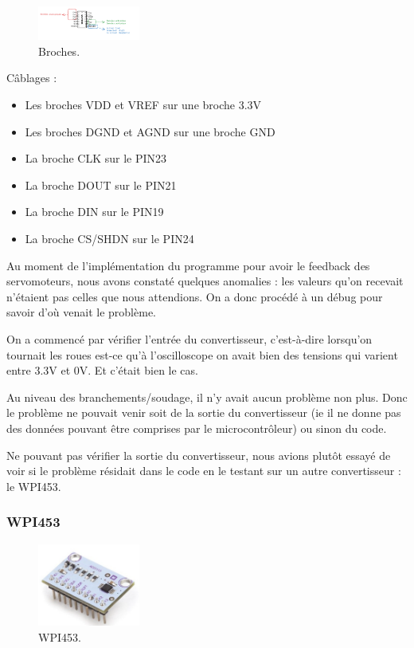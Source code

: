 \documentclass[a4paper,12pt]{report}  %
\begin{document}
\begin{figure}[H]
	\centering
	\includegraphics[width=0.3\textwidth]{./attachments/broches.png}
	\caption{Broches.}
\end{figure}

Câblages : 

\begin{itemize}
	\item Les broches VDD et VREF sur une broche 3.3V
	\item Les broches DGND et AGND sur une broche GND
	\item La broche CLK sur le PIN23
	\item La broche DOUT sur le PIN21
	\item La broche DIN sur le PIN19
	\item La broche CS/SHDN sur le PIN24
\end{itemize}

Au moment de l’implémentation du programme pour avoir le feedback des servomoteurs, nous avons constaté quelques anomalies : les valeurs qu’on recevait n’étaient pas celles que nous attendions. On a donc procédé à un débug pour savoir d’où venait le problème. 

On a commencé par vérifier l’entrée du convertisseur, c’est-à-dire lorsqu’on tournait les roues est-ce qu’à l’oscilloscope on avait bien des tensions qui varient entre 3.3V et 0V. Et c’était bien le cas. 

Au niveau des branchements/soudage, il n’y avait aucun problème non plus. Donc le problème ne pouvait venir soit de la sortie du convertisseur (ie il ne donne pas des données pouvant être comprises par le microcontrôleur) ou sinon du code. 

Ne pouvant pas vérifier la sortie du convertisseur, nous avions plutôt essayé de voir si le problème résidait dans le code en le testant sur un autre convertisseur : le WPI453. 

\subsubsection{WPI453}

\begin{figure}[H]
	\centering
	\includegraphics[width=0.3\textwidth]{./attachments/WPI453.png}
	\caption{WPI453.}
\end{figure}
\end{document}

